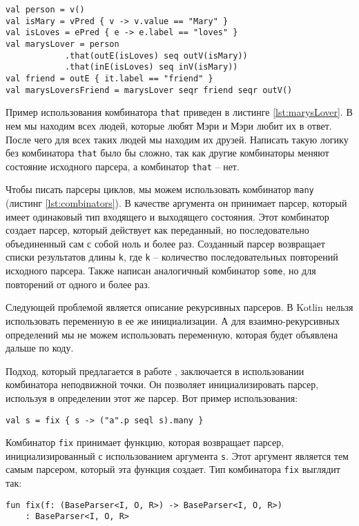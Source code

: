 \begin{lstlisting}[float=ht, label=lst:marysLover, caption={Пример запроса к графу с комбинатором \texttt{that}}]
val person = v()
val isMary = vPred { v -> v.value == "Mary" }
val isLoves = ePred { e -> e.label == "loves" }
val marysLover = person
            .that(outE(isLoves) seq outV(isMary))
            .that(inE(isLoves) seq inV(isMary))
val friend = outE { it.label == "friend" }
val marysLoversFriend = marysLover seqr friend seqr outV()
\end{lstlisting}

Пример использования комбинатора \texttt{that} приведен в листинге \ref{lst:marysLover}. В нем мы находим всех людей, которые любят Мэри и Мэри любит их в ответ. После чего для всех таких людей мы находим их друзей. Написать такую логику без комбинатора \texttt{that} было бы сложно, так как другие комбинаторы меняют состояние исходного парсера, а комбинатор \texttt{that} -- нет.

Чтобы писать парсеры циклов, мы можем использовать комбинатор \texttt{many} (листинг \ref{lst:combinators}).
В качестве аргумента он принимает парсер, который имеет одинаковый тип входящего и выходящего состояния.
Этот комбинатор создает парсер, который действует как переданный, но последовательно объединенный сам с собой ноль и более раз.
Созданный парсер возвращает списки результатов длины \texttt{k}, где \texttt{k} -- количество последовательных повторений исходного парсера.
Также написан аналогичный комбинатор \texttt{some}, но для повторений от одного и более раз.

Следующей проблемой является описание рекурсивных парсеров. В Kotlin нельзя использовать переменную в ее же инициализации. А для взаимно-рекурсивных определений мы не можем использовать переменную, которая будет объявлена дальше по коду.

Подход, который предлагается в работе \cite{Meerkat}, заключается в использовании комбинатора неподвижной точки.
Он позволяет инициализировать парсер, используя в определении этот же парсер. Вот пример использования:
\begin{lstlisting}
val s = fix { s -> ("a".p seql s).many }
\end{lstlisting}
Комбинатор \texttt{fix} принимает функцию, которая возвращает парсер, инициализированный с использованием  аргумента \texttt{s}. Этот аргумент является тем самым парсером, который эта функция создает.
Тип комбинатора \texttt{fix} выглядит так:

\begin{nobreaks}
    \begin{lstlisting}
fun fix(f: (BaseParser<I, O, R>) -> BaseParser<I, O, R>)
    : BaseParser<I, O, R>
\end{lstlisting}
\end{nobreaks}

